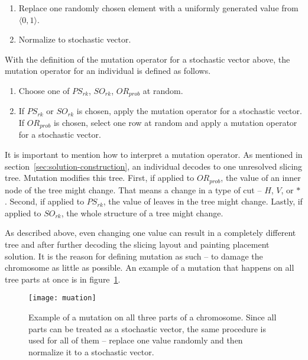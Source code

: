 \begin{enumerate}
    \item Replace one randomly chosen element with a uniformly generated value from $\langle 0,1 \rangle$.
    \item Normalize to stochastic vector.
\end{enumerate}

With the definition of the mutation operator for a stochastic vector above, the mutation operator for an individual is defined as follows.

\begin{enumerate}
    \item Choose one of $PS_{rk}$, $SO_{rk}$, $OR_{prob}$ at random.
    \item If $PS_{rk}$ or $SO_{rk}$ is chosen, apply the mutation operator for a stochastic vector.\\
    If $OR_{prob}$ is chosen, select one row at random and apply a mutation operator for a stochastic vector.
\end{enumerate}

It is important to mention how to interpret a mutation operator.
As mentioned in section~\ref{sec:solution-construction}, an individual decodes to one unresolved slicing tree.
Mutation modifies this tree.
First, if applied to $OR_{prob}$, the value of an inner node of the tree might change.
That means a change in a type of cut – $H$, $V$, or $*$.
Second, if applied to $PS_{rk}$, the value of leaves in the tree might change.
Lastly, if applied to $SO_{rk}$, the whole structure of a tree might change.

As described above, even changing one value can result in a completely different tree and
after further decoding the slicing layout and painting placement solution.
It is the reason for defining mutation as such – to damage the chromosome as little as possible.
An example of a mutation that happens on all tree parts at once is in figure~\ref{fig:mutation}.


\begin{figure}[!h]
    \texttt{[image: muation]}
    \caption[Example of a mutation on all three parts of a chromosome]{
        Example of a mutation on all three parts of a chromosome.
        Since all parts can be treated as a stochastic vector, the same procedure
        is used for all of them – replace one value randomly and then normalize it to a stochastic vector.
    }
    \label{fig:mutation}
\end{figure}
